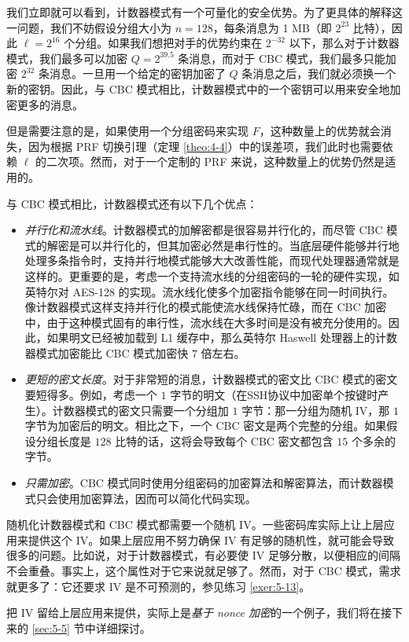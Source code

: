 我们立即就可以看到，计数器模式有一个可量化的安全优势。为了更具体的解释这一问题，我们不妨假设分组大小为 $n=128$，每条消息为 1 MB（即 $2^{23}$ 比特），因此 $\ell=2^{16}$ 个分组。如果我们想把对手的优势约束在 $2^{-32}$ 以下，那么对于计数器模式，我们最多可以加密 $Q=2^{39.5}$ 条消息，而对于 CBC 模式，我们最多只能加密 $2^{32}$ 条消息。一旦用一个给定的密钥加密了 $Q$ 条消息之后，我们就必须换一个新的密钥。因此，与 CBC 模式相比，计数器模式中的一个密钥可以用来安全地加密更多的消息。

但是需要注意的是，如果使用一个分组密码来实现 $F$，这种数量上的优势就会消失，因为根据 PRF 切换引理（定理 \ref{theo:4-4}）中的误差项，我们此时也需要依赖 $\ell$ 的二次项。然而，对于一个定制的 PRF 来说，这种数量上的优势仍然是适用的。

与 CBC 模式相比，计数器模式还有以下几个优点：
\begin{itemize}
	\item \emph{并行化和流水线}。计数器模式的加解密都是很容易并行化的，而尽管 CBC 模式的解密是可以并行化的，但其加密必然是串行性的。当底层硬件能够并行地处理多条指令时，支持并行地模式能够大大改善性能，而现代处理器通常就是这样的。更重要的是，考虑一个支持流水线的分组密码的一轮的硬件实现，如英特尔对 AES-128 的实现。流水线化使多个加密指令能够在同一时间执行。像计数器模式这样支持并行化的模式能使流水线保持忙碌，而在 CBC 加密中，由于这种模式固有的串行性，流水线在大多时间是没有被充分使用的。因此，如果明文已经被加载到 L1 缓存中，那么英特尔 Haswell 处理器上的计数器模式加密能比 CBC 模式加密快 $7$ 倍左右。
	\item \emph{更短的密文长度}。对于非常短的消息，计数器模式的密文比 CBC 模式的密文要短得多。例如，考虑一个 $1$ 字节的明文（在SSH协议中加密单个按键时产生）。计数器模式的密文只需要一个分组加 $1$ 字节：那一分组为随机 IV，那 $1$ 字节为加密后的明文。相比之下，一个 CBC 密文是两个完整的分组。如果假设分组长度是 $128$ 比特的话，这将会导致每个 CBC 密文都包含 $15$ 个多余的字节。
	\item \emph{只需加密}。CBC 模式同时使用分组密码的加密算法和解密算法，而计数器模式只会使用加密算法，因而可以简化代码实现。
\end{itemize}

\begin{remark}\label{remark:5-4}
随机化计数器模式和 CBC 模式都需要一个随机 IV。一些密码库实际上让上层应用来提供这个 IV。如果上层应用不努力确保 IV 有足够的随机性，就可能会导致很多的问题。比如说，对于计数器模式，有必要使 IV 足够分散，以便相应的间隔不会重叠。事实上，这个属性对于它来说就足够了。然而，对于 CBC 模式，需求就更多了：它还要求 IV 是不可预测的，参见练习 \ref{exer:5-13}。

把 IV 留给上层应用来提供，实际上是\emph{基于 nonce 加密}的一个例子，我们将在接下来的 \ref{sec:5-5} 节中详细探讨。
\end{remark}